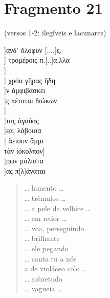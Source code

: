 \section{Fragmento 21}

\begin{gkverse}
\textnormal{(versos 1-2: ilegíveis e lacunares)}

]α̣νδ’ ὄλοφυν [....]ε̣.\\
] τρομέροις π.[..]α.λλα\\
]\\
  ] χρόα γῆρας ἤδη\\
   ]ν ἀμφιβάσκει\\
     ]ς πέταται διώκων\\
     ]\\
     ]τας ἀγαύας\\
   ]ε̣α, λάβοισα\\
   ] ἄεισον ἄμμι\\
τὰν ἰόκολπον\qquad         ]\\
        ]ρ̣ων μάλιστα\\
         ]ας π[λ]άναται
\end{gkverse}


\begin{verse}
\ldots{} lamento \ldots{}\\
\ldots{} trêmulos \ldots{}\\
\ldots{} a pele da velhice \ldots{}\\
\ldots{} em redor \ldots{}\\
\ldots{} voa, perseguindo\\
\ldots{} brilhante\\
\ldots{} ele pegando\\
\ldots{} canta tu a nós\\
a de violáceo colo \ldots{}\\
\ldots{} sobretudo\\
\ldots{} vagueia \ldots{}
\end{verse}

